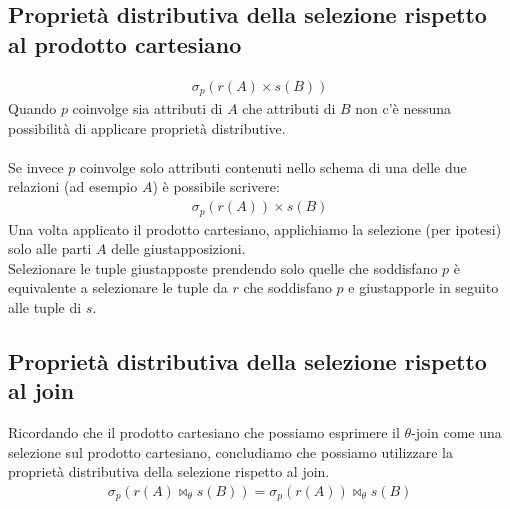 \subsection{Proprietà distributiva della selezione rispetto al prodotto cartesiano}
    \begin{equation}\begin{aligned}
        \sigma_p(r(A) \times s(B))
    \end{aligned}\end{equation}
Quando $p$ coinvolge sia attributi di $A$ che attributi di $B$ non c'è nessuna possibilità di applicare proprietà distributive.\\\\
Se invece $p$ coinvolge solo attributi contenuti nello schema di una delle due relazioni (ad esempio $A$) è possibile scrivere:
    \begin{equation}\begin{aligned}
        \sigma_p(r(A)) \times s(B)
    \end{aligned}\end{equation}
Una volta applicato il prodotto cartesiano, applichiamo la selezione (per ipotesi) solo alle parti $A$ delle giustapposizioni.\\
Selezionare le tuple giustapposte prendendo solo quelle che soddisfano $p$ è equivalente a selezionare le tuple da $r$ che soddisfano $p$ e giustapporle in seguito alle tuple di $s$.

\subsection{Proprietà distributiva della selezione rispetto al join}
Ricordando che il prodotto cartesiano che possiamo esprimere il $\theta$-join come una selezione sul prodotto cartesiano, concludiamo che possiamo utilizzare la proprietà distributiva della selezione rispetto al join.
    \begin{equation}\begin{aligned}
        \sigma_p(r(A) \bowtie_{\theta} s(B)) = \sigma_p(r(A)) \bowtie_{\theta} s(B)
    \end{aligned}\end{equation}

